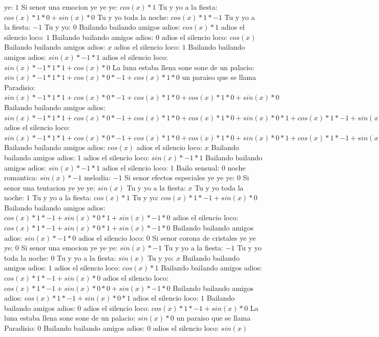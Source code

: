 \documentclass{article}
\begin{document}
ye: $1$  \newline Si senor una emocion ye ye ye: $cos(x)*1$ Tu y yo a la fiesta: $cos(x)*1*0+sin(x)*0$ Tu y yo toda la noche: $cos(x)*1*-1$ Tu y yo a la fiesta: $-1$ Tu y yo: $0$  \newline Bailando bailando amigos adios: $cos(x)*1$ adios el silencio loco: $1$ Bailando bailando amigos adios: $0$  \newline adios el silencio loco: $cos(x)$  \newline Bailando bailando amigos adios: $x$ adios el silencio loco: $1$  \newline Bailando bailando amigos adios: $sin(x)*-1*1$ adios el silencio loco: $sin(x)*-1*1*1+cos(x)*0$ La luna estaba llena sone sone de un palacio: ${sin(x)*-1*1*1+cos(x)*0}*-1+cos(x)*1*0$ un paraiso que se llama Paradisio: ${sin(x)*-1*1*1+cos(x)*0}*-1+cos(x)*1*0+cos(x)*1*0+sin(x)*0$ Bailando bailando amigos adios: ${{sin(x)*-1*1*1+cos(x)*0}*-1+cos(x)*1*0+cos(x)*1*0+sin(x)*0}*1+{cos(x)*1*-1+sin(x)*0}*0$ adios el silencio loco: ${{sin(x)*-1*1*1+cos(x)*0}*-1+cos(x)*1*0+cos(x)*1*0+sin(x)*0}*1+{cos(x)*1*-1+sin(x)*0}*0+{cos(x)*1*-1+sin(x)*0}*0+sin(x)*-1*0$ Bailando bailando amigos adios: $cos(x)$  \newline adios el silencio loco: $x$ Bailando bailando amigos adios: $1$  \newline adios el silencio loco: $sin(x)*-1*1$ Bailando bailando amigos adios: $sin(x)*-1*1$ adios el silencio loco: $1$ Bailo sensual: $0$  \newline noche romantica: $sin(x)*-1$ melodia: $-1$ Si senor efectos especiales ye ye ye: $0$  \newline Si senor una tentacion ye ye ye: $sin(x)$  \newline Tu y yo a la fiesta: $x$ Tu y yo toda la noche: $1$  \newline Tu y yo a la fiesta: $cos(x)*1$ Tu y yo: $cos(x)*1*-1+sin(x)*0$ Bailando bailando amigos adios: ${cos(x)*1*-1+sin(x)*0}*1+sin(x)*-1*0$ adios el silencio loco: ${cos(x)*1*-1+sin(x)*0}*1+sin(x)*-1*0$  \newline Bailando bailando amigos adios: $sin(x)*-1*0$ adios el silencio loco: $0$ Si senor corona de cristales ye ye ye: $0$  \newline Si senor una emocion ye ye ye: $sin(x)*-1$ Tu y yo a la fiesta: $-1$ Tu y yo toda la noche: $0$  \newline Tu y yo a la fiesta: $sin(x)$  \newline Tu y yo: $x$ Bailando bailando amigos adios: $1$  \newline adios el silencio loco: $cos(x)*1$ Bailando bailando amigos adios: $cos(x)*1*-1+sin(x)*0$ adios el silencio loco: ${cos(x)*1*-1+sin(x)*0}*0+sin(x)*-1*0$ Bailando bailando amigos adios: ${cos(x)*1*-1+sin(x)*0}*1$ adios el silencio loco: $1$ Bailando bailando amigos adios: $0$  \newline adios el silencio loco: $cos(x)*1*-1+sin(x)*0$  \newline La luna estaba llena sone sone de un palacio: $sin(x)*0$ un paraiso que se llama Paradisio: $0$ Bailando bailando amigos adios: $0$  \newline adios el silencio loco: $sin(x)$ 
\end{document}
